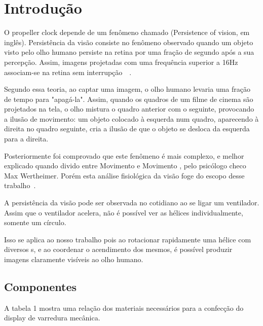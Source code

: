 \chapter{Introdução}
\label{chap:intro}

O propeller clock depende de um fenômeno chamado  (Persistence of vision, em inglês). Persistência da visão consiste no fenômeno observado quando um objeto visto pelo olho humano persiste na retina por uma fração de segundo após a sua percepção. Assim, imagens projetadas com uma frequência superior a 16Hz associam-se na retina sem interrupção~\cite{Wikipedia2013}~\cite{Anderson1993}.

Segundo essa teoria, ao captar uma imagem, o olho humano levaria uma fração de tempo para "apagá-la". Assim, quando os quadros de um filme de cinema são projetados na tela, o olho mistura o quadro anterior com o seguinte, provocando a ilusão de movimento: um objeto colocado à esquerda num quadro, aparecendo à direita no quadro seguinte, cria a ilusão de que o objeto se desloca da esquerda para a direita.

Posteriormente foi comprovado que este fenômeno é mais complexo, e melhor explicado quando divido entre Movimento  e Movimento , pelo psicólogo checo Max Wertheimer. Porém esta análise fisiológica da visão foge do escopo desse trabalho~\cite{Kaufman1974}.

A persistência da visão pode ser observada no cotidiano ao se ligar um ventilador. Assim que o ventilador acelera, não é possível ver as hélices individualmente, somente um círculo.

Isso se aplica ao nosso trabalho pois ao rotacionar rapidamente uma hélice com diversos s, e ao coordenar o acendimento dos mesmos, é possível produzir imagens claramente visíveis ao olho humano.

\section{Componentes} %
A tabela 1 mostra uma relação dos materiais necessários para a confecção do display de varredura mecânica.

